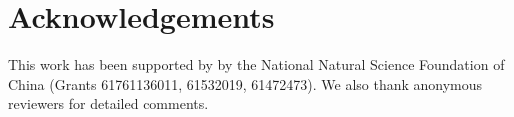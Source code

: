 \vspace{-1.8em}
\section*{Acknowledgements}
\vspace{-1em}

This work has been supported by by the National Natural Science Foundation of
China (Grants 61761136011, 61532019, 61472473).
We also thank anonymous reviewers for detailed comments.
